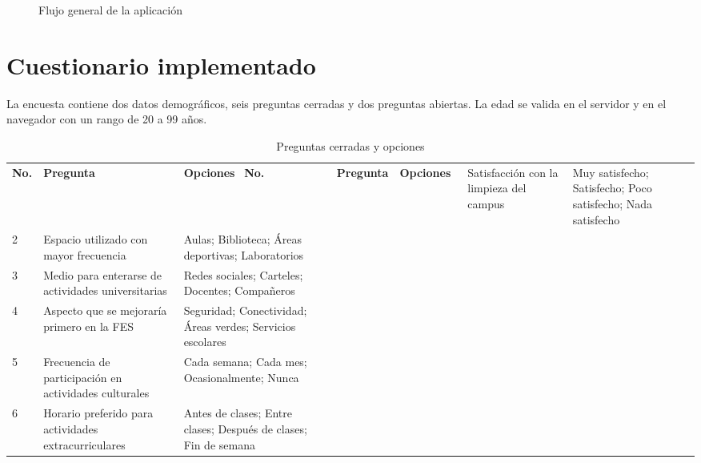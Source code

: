 \documentclass[12pt,letterpaper,oneside]{extreport}
\begin{document}
\begin{figure}[H]
\centering
{}
\caption{Flujo general de la aplicación}
\end{figure}

\chapter{Cuestionario implementado}

La encuesta contiene dos datos demográficos, seis preguntas cerradas y dos preguntas abiertas. La edad se valida en el servidor y en el navegador con un rango de 20 a 99 años.

\begin{longtable}{p{}p{}p{}}
\caption{Preguntas cerradas y opciones}\label{tab:preguntas}\\
\toprule
\textbf{No.} & \textbf{Pregunta} & \textbf{Opciones}\
\midrule
\endfirsthead
\toprule
\textbf{No.} & \textbf{Pregunta} & \textbf{Opciones}\
\midrule
{} & Satisfacción con la limpieza del campus & Muy satisfecho; Satisfecho; Poco satisfecho; Nada satisfecho\\
2 & Espacio utilizado con mayor frecuencia & Aulas; Biblioteca; Áreas deportivas; Laboratorios\\
3 & Medio para enterarse de actividades universitarias & Redes sociales; Carteles; Docentes; Compañeros\\
4 & Aspecto que se mejoraría primero en la FES & Seguridad; Conectividad; Áreas verdes; Servicios escolares\\
5 & Frecuencia de participación en actividades culturales & Cada semana; Cada mes; Ocasionalmente; Nunca\\
6 & Horario preferido para actividades extracurriculares & Antes de clases; Entre clases; Después de clases; Fin de semana\\
\bottomrule
\end{longtable}
\end{document}
